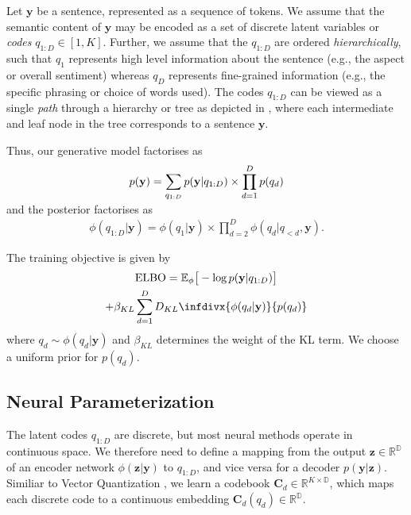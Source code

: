 \documentclass[11pt]{article}
\newcommand{\infdiv}{D_{KL}\infdivx}
\begin{document}
Let $\textbf{y}$ be a sentence, represented as a sequence of tokens. We assume that the semantic content of $\textbf{y}$ may be encoded as a set of discrete latent variables or \textit{codes} $q_{1:D} \in [1, K]$. Further, we assume that the $q_{1:D}$ are ordered \textit{hierarchically}, such that $q_1$ represents high level information about the sentence (e.g., the aspect or overall sentiment) whereas $q_D$ represents fine-grained information (e.g., the specific phrasing or choice of words used). The codes $q_{1:D}$ can be viewed as a single \textit{path} through a hierarchy or tree as depicted in , where each intermediate and leaf node in the tree corresponds to a sentence $\textbf{y}$.








Thus, our generative model factorises as
\begin{multline}
\vspace{-.2cm}
    p(\textbf{y})
    = \sum_{q_{1:D}}p(\textbf{y}| q_{1:D}) \times \prod
\limits_{d=1}^D  p(q_d)
\end{multline}
and the posterior factorises as
\vspace{-.2cm}
\begin{multline}
    \phi(q_{1:D} | \textbf{y}) =
     \phi(q_1 | \textbf{y}) \times \prod \limits_{d=2}^D \phi(q_d | q_{< d}, \textbf{y}).
\end{multline}

The training objective is given by
\begin{multline} \label{eq:finalobjective}
    \text{ELBO} = \mathbb{E}_{\phi}\big [-\log p(\textbf{y} |  q_{1:D}) \big ] \\
      + \beta_{KL} \sum\limits_{d=1}^D \infdiv{\phi(q_d | \textbf{y}) }{ p(q_d) }
\end{multline}
where $q_d \sim \phi(q_d|\textbf{y})$ and $\beta_{KL}$ determines the weight of the KL term. We choose a uniform prior for $p(q_d)$.



\subsection{Neural Parameterization}

The latent codes $q_{1:D}$ are discrete, but most neural methods operate in continuous space. We therefore need to define a mapping from the output $\textbf{z} \in \mathbb{R}^{\mathbb{D}}$ of an encoder network $\phi(\textbf{z} | \textbf{y})$ to $q_{1:D}$, and vice versa for a decoder $p(\textbf{y} | \textbf{z})$. Similiar to Vector Quantization \cite[VQ,][]{vqvae}, we learn a codebook $\textbf{C}_d \in \mathbb{R}^{K \times \mathbb{D}}$, which maps each discrete code to a continuous embedding $\textbf{C}_d(q_d) \in \mathbb{R}^{\mathbb{D}}$.
\end{document}
